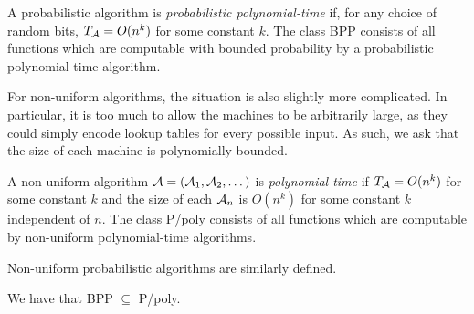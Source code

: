 \begin{dfn}
  A probabilistic algorithm is \emph{probabilistic polynomial-time} if, for any
  choice of random bits, $T_{\mathcal{A}} = O(n^k)$ for some constant $k$. The class BPP
  consists of all functions which are computable with bounded probability by a
  probabilistic polynomial-time algorithm.
\end{dfn}

For non-uniform algorithms, the situation is also slightly more complicated. In
particular, it is too much to allow the machines to be arbitrarily large, as
they could simply encode lookup tables for every possible input. As such, we ask
that the size of each machine is polynomially bounded.

\begin{dfn}
  A non-uniform algorithm $\mathcal{A} = (\mathcal{A}_1, \mathcal{A}_2, \dots)$ is
  \emph{polynomial-time} if $T_{\mathcal{A}} = O(n^k)$ for some constant $k$ and the size
  of each $\mathcal{A}_n$ is $O(n^k)$ for some constant $k$ independent of $n$. The
  class P/poly consists of all functions which are computable by non-uniform
  polynomial-time algorithms.
\end{dfn}

Non-uniform probabilistic algorithms are similarly defined.

\begin{thm}\label{thm:adelman}
  We have that BPP $\subseteq$ P/poly.
\end{thm}
